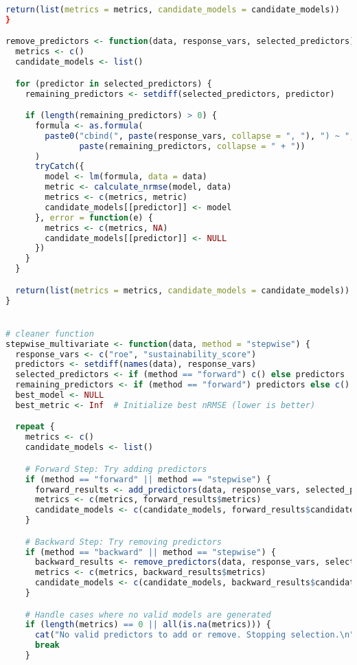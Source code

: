 \begin{lstlisting}[language=R, breaklines=true, basicstyle=\ttfamily\small, columns=fullflexible]
  return(list(metrics = metrics, candidate_models = candidate_models))
}

remove_predictors <- function(data, response_vars, selected_predictors) {
  metrics <- c()
  candidate_models <- list()

  for (predictor in selected_predictors) {
    remaining_predictors <- setdiff(selected_predictors, predictor)

    if (length(remaining_predictors) > 0) {
      formula <- as.formula(
        paste0("cbind(", paste(response_vars, collapse = ", "), ") ~ ",
               paste(remaining_predictors, collapse = " + "))
      )
      tryCatch({
        model <- lm(formula, data = data)
        metric <- calculate_nrmse(model, data)
        metrics <- c(metrics, metric)
        candidate_models[[predictor]] <- model
      }, error = function(e) {
        metrics <- c(metrics, NA)
        candidate_models[[predictor]] <- NULL
      })
    }
  }

  return(list(metrics = metrics, candidate_models = candidate_models))
}


# cleaner function
stepwise_multivariate <- function(data, method = "stepwise") {
  response_vars <- c("roe", "sustainability_score")
  predictors <- setdiff(names(data), response_vars)
  selected_predictors <- if (method == "forward") c() else predictors
  remaining_predictors <- if (method == "forward") predictors else c()
  best_model <- NULL
  best_metric <- Inf  # Initialize best nRMSE (lower is better)

  repeat {
    metrics <- c()
    candidate_models <- list()

    # Forward Step: Try adding predictors
    if (method == "forward" || method == "stepwise") {
      forward_results <- add_predictors(data, response_vars, selected_predictors, remaining_predictors)
      metrics <- c(metrics, forward_results$metrics)
      candidate_models <- c(candidate_models, forward_results$candidate_models)
    }

    # Backward Step: Try removing predictors
    if (method == "backward" || method == "stepwise") {
      backward_results <- remove_predictors(data, response_vars, selected_predictors)
      metrics <- c(metrics, backward_results$metrics)
      candidate_models <- c(candidate_models, backward_results$candidate_models)
    }

    # Handle cases where no valid models are generated
    if (length(metrics) == 0 || all(is.na(metrics))) {
      cat("No valid predictors to add or remove. Stopping selection.\n")
      break
    }


\end{lstlisting}
